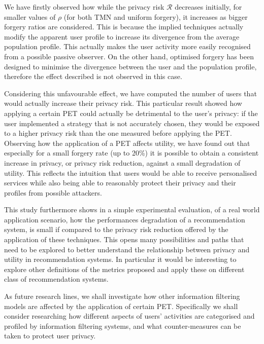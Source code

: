 We have firstly observed how while the privacy risk $\mathcal{R}$  decreases initially, for smaller values of $\rho$ (for both TMN and uniform forgery), it increases as bigger forgery ratios are considered. This is because the implied techniques actually modify the apparent user profile to increase its divergence from the average population profile. This actually makes the user activity more easily recognised from a possible passive observer. On the other hand, optimised forgery has been designed to minimise the divergence between the user and the population profile, therefore the effect described is not observed in this case.

Considering this unfavourable effect, we have computed the number of users that would actually increase their privacy risk. This particular result showed how applying a certain PET could actually be detrimental to the user's privacy: if the user implemented a strategy that is not accurately chosen, they would be exposed to a higher privacy risk than the one measured before applying the PET.
Observing how the application of a PET affects utility, we have found out that especially for a small forgery rate (up to 20\%) it is possible to obtain a consistent increase in privacy, or privacy risk reduction, against a small degradation of utility. This reflects the intuition that users would be able to receive personalised services while also being able to reasonably protect their privacy and their profiles from possible attackers.

This study furthermore shows in a simple experimental evaluation, of a real world application scenario, how the performances degradation of a recommendation system, is small if compared to the privacy risk reduction offered by the application of these techniques. This opens many possibilities and paths that need to be explored to better understand the relationship between privacy and utility in recommendation systems. In particular it would be interesting to explore other definitions of the metrics proposed and apply these on different class of recommendation systems.

As future research lines, we shall investigate how other information filtering models are affected by the application of certain PET. Specifically we shall consider researching how different aspects of users' activities are categorised and profiled by information filtering systems, and what counter-measures can be taken to protect user privacy.